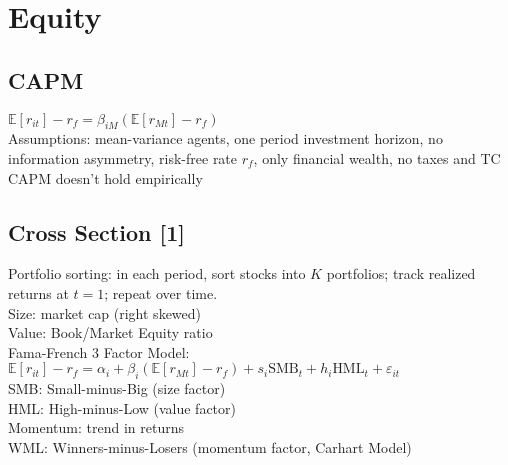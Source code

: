 \section{Equity}
	\subsection*{CAPM}
	$\mathbb{E}\left[r_{it}\right] - r_{f} = \beta_{iM}\left(\mathbb{E}\left[r_{Mt}\right] - r_{f}\right)$\\
	Assumptions: mean-variance agents, one period investment horizon, no information asymmetry, risk-free rate $r_{f}$, only financial wealth, no taxes and TC\\
	CAPM doesn't hold empirically
	
	\subsection*{Cross Section [1]}
	Portfolio sorting: in each period, sort stocks into $K$ portfolios; track realized returns at $t = 1$; repeat over time.\\
	Size: market cap (right skewed)\\
	Value: Book/Market Equity ratio\\
	Fama-French 3 Factor Model: $\mathbb{E}\left[r_{it}\right] - r_{f} = \alpha_{i} + \beta_{i}\left(\mathbb{E}\left[r_{Mt}\right] - r_{f}\right) + s_{i}\text{SMB}_{t} + h_{i}\text{HML}_{t} + \varepsilon_{it}$\\
	SMB: Small-minus-Big (size factor)\\
	HML: High-minus-Low (value factor)\\
	Momentum: trend in returns\\
	WML: Winners-minus-Losers (momentum factor, Carhart Model)
	
